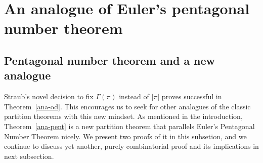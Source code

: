 \documentclass[12pt]{amsart}
\numberwithin{equation}{section}
\theoremstyle{plain}
\newtheorem{theorem}{Theorem}[section]
\theoremstyle{definition}
\begin{document}
%

\section{An analogue of Euler's pentagonal number theorem}\label{sec:ana-pent}

\subsection{Pentagonal number theorem and a new analogue}
Straub's novel decision to fix $\Gamma(\pi)$ instead of $|\pi|$ proves successful in Theorem~\ref{ana-od}. This encourages us to seek for other analogues of the classic partition theorems with this new mindset. As mentioned in the introduction, Theorem~\ref{ana-pent} is a new partition theorem that parallels Euler's Pentagonal Number Theorem nicely. We present two proofs of it in this subsetion, and we continue to discuss yet another, purely combinatorial proof and its implications in next subsection.
\end{document}
